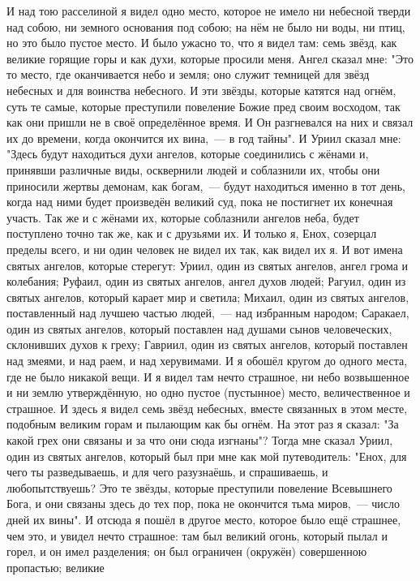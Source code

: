 И над тою расселиной я видел одно место, которое не имело ни небесной
тверди над собою, ни земного основания под собою; на нём не было ни воды, ни
птиц, но это было пустое место.
И было ужасно то, что я видел там: семь звёзд, как великие горящие
горы и как духи, которые просили меня.
Ангел сказал мне: "Это то место, где оканчивается небо и земля; оно
служит темницей для звёзд небесных и для воинства небесного.
И эти звёзды, которые катятся над огнём, суть те самые, которые
преступили повеление Божие пред своим восходом, так как они пришли не в своё
определённое время.
И Он разгневался на них и связал их до времени, когда окончится их
вина,~--- в год тайны".
И Уриил сказал мне: "Здесь будут находиться духи ангелов,
которые соединились с жёнами и, принявши различные виды, осквернили людей и
соблазнили их, чтобы они приносили жертвы демонам, как богам,~--- будут
находиться именно в тот день, когда над ними будет произведён великий суд, пока
не постигнет их конечная участь.
Так же и с жёнами их, которые соблазнили ангелов неба, будет
поступлено точно так же, как и с друзьями их.
И только я, Енох, созерцал пределы всего, и ни один человек не видел
их так, как видел их я.
И вот имена святых ангелов, которые стерегут: Уриил, один из
святых ангелов, ангел грома и колебания; Руфаил, один из святых ангелов, ангел
духов людей; Рагуил, один из святых ангелов, который карает мир и светила;
Михаил, один из святых ангелов, поставленный над лучшею частью людей,~--- над
избранным народом; Саракаел, один из святых ангелов, который поставлен над
душами сынов человеческих, склонивших духов к греху; Гавриил, один из святых
ангелов, который поставлен над змеями, и над раем, и над херувимами.
И я обошёл кругом до одного места, где не было никакой вещи.
И я видел там нечто страшное, ни небо возвышенное и ни землю
утверждённую, но одно пустое (пустынное) место, величественное и страшное.
И здесь я видел семь звёзд небесных, вместе связанных в этом месте,
подобным великим горам и пылающим как бы огнём.
На этот раз я сказал: "За какой грех они связаны и за что они сюда
изгнаны"?
Тогда мне сказал Уриил, один из святых ангелов, который был при мне
как мой путеводитель: "Енох, для чего ты разведываешь, и для чего разузнаёшь,
и спрашиваешь, и любопытствуешь?
Это те звёзды, которые преступили повеление Всевышнего Бога, и они
связаны здесь до тех пор, пока не окончится тьма миров,~--- число дней их вины".
И отсюда я пошёл в другое место, которое было ещё страшнее, чем это,
и увидел нечто страшное: там был великий огонь, который пылал и горел, и он
имел разделения; он был ограничен (окружён) совершенною пропастью; великие
